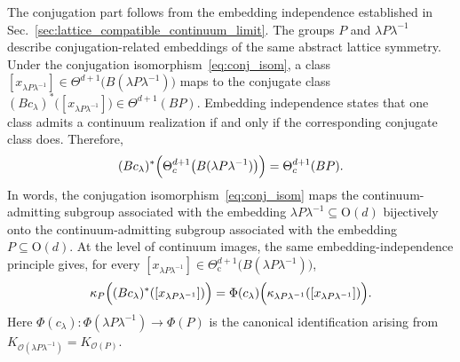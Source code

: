 \documentclass[aps,prx,reprint,superscriptaddress,twocolumn,amsmath,amssymb,amsfonts, nofootinbib]{revtex4-2}
\theoremstyle{apsstyle}
\begin{document}
\noindent The conjugation part follows from the embedding independence established in Sec.~\ref{sec:lattice_compatible_continuum_limit}. 
The groups $P$ and $\lambda P\lambda^{-1}$ describe conjugation-related embeddings of the same abstract lattice symmetry.
Under the conjugation isomorphism~\eqref{eq:conj_isom}, a class
$[x_{\lambda P\lambda^{-1}}]\in \Theta^{d+1}\bigl(B(\lambda P\lambda^{-1})\bigr)$ maps to the conjugate
class $(Bc_\lambda)^{*} \bigl([x_{\lambda P\lambda^{-1}}]\bigr) \in \Theta^{d+1}(BP)$. 
Embedding independence states that one class admits a continuum realization if and only if the corresponding conjugate class does.
Therefore,
\begin{equation} 
(Bc_\lambda)^{*} \Bigl( \Theta^{d+1}_{c}\bigl(B(\lambda P\lambda^{-1})\bigr) \Bigr) = \Theta^{d+1}_{c}(BP). 
\label{eq:st2} 
\end{equation} 
In words, the conjugation isomorphism~\eqref{eq:conj_isom} maps the continuum-admitting subgroup associated with the embedding $\lambda P\lambda^{-1}\subseteq\mathrm{O}(d)$ bijectively onto the continuum-admitting subgroup associated with the embedding $P\subseteq\mathrm{O}(d)$.
At the level of continuum images, the same embedding-independence principle gives, for every $[x_{\lambda P\lambda^{-1}}]\in \Theta_{\mathrm c}^{d+1}\bigl(B(\lambda P\lambda^{-1})\bigr)$, 
\begin{equation} 
\kappa_P\Bigl((Bc_\lambda)^{*}([x_{\lambda P\lambda^{-1}}]) \Bigr) = \Phi(c_\lambda)\Bigl( \kappa_{\lambda P\lambda^{-1}}([x_{\lambda P\lambda^{-1}}]) \Bigr). 
\label{eq:continuum_conjugation_compatibility} 
\end{equation} 
Here $\Phi(c_\lambda): \Phi(\lambda P\lambda^{-1})\to\Phi(P)$ is the canonical identification arising from $K_{\mathcal O(\lambda P\lambda^{-1})}=K_{\mathcal O(P)}$.

\bigskip 
\end{document}
